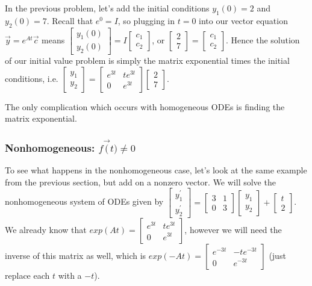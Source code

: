 In the previous problem, let's add the initial conditions $y_1(0)=2$ and $y_2(0)=7$. Recall that $e^0=I$, so plugging in $t=0$ into our vector equation $\vec y = e^{At}\vec c$ means 
$
\begin{bmatrix}
y_1(0)\\
y_2(0)
\end{bmatrix}
=I
\begin{bmatrix}
c_1\\
c_2
\end{bmatrix}
$, or 
$
\begin{bmatrix}
2\\
7
\end{bmatrix}
=
\begin{bmatrix}
c_1\\
c_2
\end{bmatrix}
$. Hence the solution of our initial value problem is simply the matrix exponential times the initial conditions, i.e.
$
\begin{bmatrix}
y_1\\
y_2
\end{bmatrix}
=
\begin{bmatrix}
e^{3t}&te^{3t}\\
0&e^{3t}
\end{bmatrix}
\begin{bmatrix}
2\\
7
\end{bmatrix}
$.

The only complication which occurs with homogeneous ODEs is finding the matrix exponential.



\subsubsection{Nonhomogeneous: $f\vec (t)\neq 0$}
To see what happens in the nonhomogeneous case, let's look at the same example from the previous section, but add on a nonzero vector. We will solve the nonhomogeneous system of ODEs given by
$
\begin{bmatrix}
y_1^\prime\\
y_2^\prime
\end{bmatrix}
=
\begin{bmatrix}
3&1\\
0&3
\end{bmatrix}
\begin{bmatrix}
y_1\\
y_2
\end{bmatrix}
+
\begin{bmatrix}
t\\
2
\end{bmatrix}
$.
We already know that $exp(At) = 
\begin{bmatrix}
e^{3t}&te^{3t}\\
0&e^{3t}
\end{bmatrix}
$, however we will need the inverse of this matrix as well, which is $exp(-At) = 
\begin{bmatrix}
e^{-3t}&-te^{-3t}\\
0&e^{-3t}
\end{bmatrix}
$ (just replace each $t$ with a $-t$).

